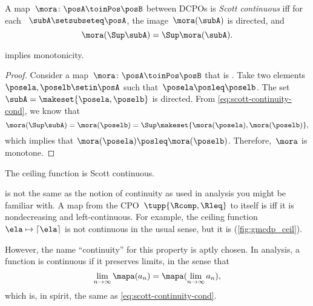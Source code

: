 \begin{definition}
    \label{def:scott-continuity}
    A map~$\mora\colon\posA\toinPos\posB$ between DCPOs is \emph{Scott continuous} iff for each ~$\subA\setsubseteq\posA$, the image~$\mora(\subA)$ is directed, and
    \begin{equation}
        \label{eq:scott-continuity-cond}
        \mora(\Sup \subA)=\Sup \mora(\subA).
    \end{equation}
\end{definition}
\begin{lemma}
     implies monotonicity.
\end{lemma}
\begin{proof}
    Consider a map~$\mora\colon\posA\toinPos\posB$ that is .
    Take two elements~$\posela, \poselb \setin \posA$ such that~$\posela\posleq\poselb$.
    The set~$ \subA =  \makeset{\posela, \poselb}$ is directed.
    From \cref{eq:scott-continuity-cond}, we know that
    \begin{equation}
        \mora(\Sup \subA) = \mora(\poselb) = \Sup \makeset{\mora(\posela), \mora(\poselb)},
    \end{equation}
    which implies that $\mora(\posela) \posleq \mora(\poselb)$.
    Therefore,~$\mora$ is monotone.
\end{proof}

\begin{marginfigure}
    \caption{The ceiling function is Scott continuous.}
    \label{fig:gmcdp_ceil}
\end{marginfigure}

\begin{remark}
     is not the same as the notion of continuity as used in analysis you might be familiar with.
    A map from the CPO~$\tupp{\Rcomp,{{\Rleq}}}$ to itself is  iff it is nondecreasing and left-continuous.
    For example, the ceiling function~$\ela \mapsto\left\lceil \ela\right\rceil $ is not continuous in the usual sense, but it is  (\cref{fig:gmcdp_ceil}).

    However, the name ``continuity'' for this property is aptly chosen.
    In analysis, a function is continuous if it preserves limits, in the sense that
    \begin{equation}
        \lim_{n\to\infty}\mapa(a_n) = \mapa(\lim_{n\to\infty}a_n),
    \end{equation}
    which is, in spirit, the same as \cref{eq:scott-continuity-cond}.
\end{remark}

